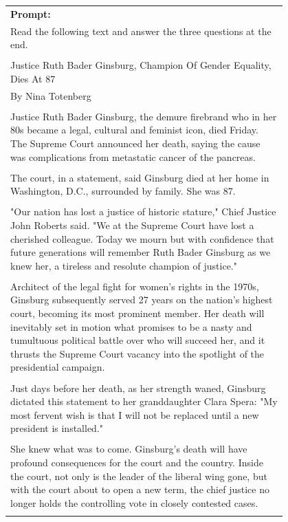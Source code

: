 \documentclass{article}
\begin{document}
\begin{figure}[hp]
    \centering
    \small
    \begin{tabular}{p{0.95\linewidth}}
    \toprule 
        \textbf{Prompt:}   \\
       Read the following text and answer the three questions at the end.\\\\
Justice Ruth Bader Ginsburg, Champion Of Gender Equality, Dies At 87\\
By Nina Totenberg\\\\
Justice Ruth Bader Ginsburg, the demure firebrand who in her 80s became a legal, cultural and feminist icon, died Friday. The Supreme Court announced her death, saying the cause was complications from metastatic cancer of the pancreas.\\\\
The court, in a statement, said Ginsburg died at her home in Washington, D.C., surrounded by family. She was 87.\\\\
"Our nation has lost a justice of historic stature," Chief Justice John Roberts said. "We at the Supreme Court have lost a cherished colleague. Today we mourn but with confidence that future generations will remember Ruth Bader Ginsburg as we knew her, a tireless and resolute champion of justice."\\\\
Architect of the legal fight for women's rights in the 1970s, Ginsburg subsequently served 27 years on the nation's highest court, becoming its most prominent member. Her death will inevitably set in motion what promises to be a nasty and tumultuous political battle over who will succeed her, and it thrusts the Supreme Court vacancy into the spotlight of the presidential campaign.\\\\
Just days before her death, as her strength waned, Ginsburg dictated this statement to her granddaughter Clara Spera: "My most fervent wish is that I will not be replaced until a new president is installed."\\\\
She knew what was to come. Ginsburg's death will have profound consequences for the court and the country. Inside the court, not only is the leader of the liberal wing gone, but with the court about to open a new term, the chief justice no longer holds the controlling vote in closely contested cases.\\\\

\end{tabular}
\end{figure}
\end{document}
